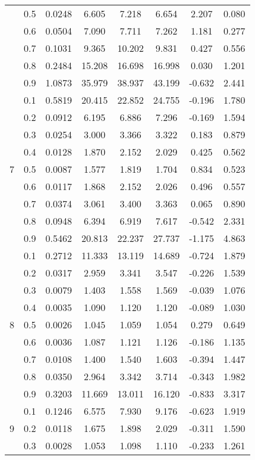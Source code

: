 \documentclass[11pt,a4paper]{report}
\begin{document}
\begin{longtable}{ | c | c || c | c | c | c | c | c | }
 & 0.5 & 0.0248 & 6.605 & 7.218 & 6.654 & 2.207 & 0.080 \\
 & 0.6 & 0.0504 & 7.090 & 7.711 & 7.262 & 1.181 & 0.277 \\
 & 0.7 & 0.1031 & 9.365 & 10.202 & 9.831 & 0.427 & 0.556 \\
 & 0.8 & 0.2484 & 15.208 & 16.698 & 16.998 & 0.030 & 1.201 \\
 & 0.9 & 1.0873 & 35.979 & 38.937 & 43.199 & -0.632 & 2.441 \\
 \hline
\multirow{9}{*}{7} & 0.1 & 0.5819 & 20.415 & 22.852 & 24.755 & -0.196 & 1.780 \\
 & 0.2 & 0.0912 & 6.195 & 6.886 & 7.296 & -0.169 & 1.594 \\
 & 0.3 & 0.0254 & 3.000 & 3.366 & 3.322 & 0.183 & 0.879 \\
 & 0.4 & 0.0128 & 1.870 & 2.152 & 2.029 & 0.425 & 0.562 \\
 & 0.5 & 0.0087 & 1.577 & 1.819 & 1.704 & 0.834 & 0.523 \\
 & 0.6 & 0.0117 & 1.868 & 2.152 & 2.026 & 0.496 & 0.557 \\
 & 0.7 & 0.0374 & 3.061 & 3.400 & 3.363 & 0.065 & 0.890 \\
 & 0.8 & 0.0948 & 6.394 & 6.919 & 7.617 & -0.542 & 2.331 \\
 & 0.9 & 0.5462 & 20.813 & 22.237 & 27.737 & -1.175 & 4.863 \\
 \hline
\multirow{9}{*}{8} & 0.1 & 0.2712 & 11.333 & 13.119 & 14.689 & -0.724 & 1.879 \\
 & 0.2 & 0.0317 & 2.959 & 3.341 & 3.547 & -0.226 & 1.539 \\
 & 0.3 & 0.0079 & 1.403 & 1.558 & 1.569 & -0.039 & 1.076 \\
 & 0.4 & 0.0035 & 1.090 & 1.120 & 1.120 & -0.089 & 1.030 \\
 & 0.5 & 0.0026 & 1.045 & 1.059 & 1.054 & 0.279 & 0.649 \\
 & 0.6 & 0.0036 & 1.087 & 1.121 & 1.126 & -0.186 & 1.135 \\
 & 0.7 & 0.0108 & 1.400 & 1.540 & 1.603 & -0.394 & 1.447 \\
 & 0.8 & 0.0350 & 2.964 & 3.342 & 3.714 & -0.343 & 1.982 \\
 & 0.9 & 0.3203 & 11.669 & 13.011 & 16.120 & -0.833 & 3.317 \\
 \hline
\multirow{9}{*}{9} & 0.1 & 0.1246 & 6.575 & 7.930 & 9.176 & -0.623 & 1.919 \\
 & 0.2 & 0.0118 & 1.675 & 1.898 & 2.029 & -0.311 & 1.590 \\
 & 0.3 & 0.0028 & 1.053 & 1.098 & 1.110 & -0.233 & 1.261 \\

\end{longtable}
\end{document}
